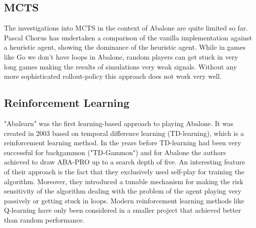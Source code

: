 \subsection{MCTS}
The investigations into MCTS in the context of Abalone are quite limited so far. Pascal Chorus has undertaken a comparison of the vanilla implementation against a heuristic agent, showing the dominance of the heuristic agent. \cite{chorus_implementing_2009} While in games like Go we don't have loops in Abalone, random players can get stuck in very long games making the results of simulations very weak signals. Without any more sophisticated rollout-policy this approach does not work very well.

\subsection{Reinforcement Learning}
"Abalearn" was the first learning-based approach to playing Abalone. \cite{campos_abalearn_2003} It was created in 2003 based on temporal difference learning (TD-learning), which is a reinforcement learning method. In the years before TD-learning had been very successful for backgammon ("TD-Gammon") \cite{tesauro_td-gammon_1994} and for Abalone the authors achieved to draw ABA-PRO up to a search depth of five. An interesting feature of their approach is the fact that they exclusively used self-play for training the algorithm. Moreover, they introduced a tunable mechanism for making the risk sensitivity of the algorithm dealing with the problem of the agent playing very passively or getting stuck in loops. Modern reinforcement learning methods like Q-learning have only been considered in a smaller project that achieved better than random performance. \cite{mizrachi_introduction_2017}

